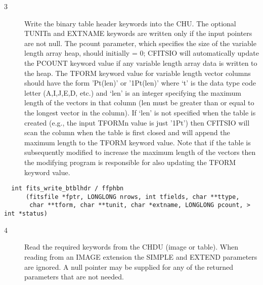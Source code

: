 \documentclass[11pt]{book}
\begin{document}
\begin{description}
\item[3 ] Write the binary table header keywords into the CHU.   The optional
   TUNITn and EXTNAME keywords are written only if the input pointers
   are not null.  The pcount parameter, which specifies the
   size of the variable length array heap, should initially = 0;
   CFITSIO will automatically update the PCOUNT keyword value if any
   variable length array data is written to the heap.  The TFORM keyword
   value for variable length vector columns should have the form 'Pt(len)'
   or '1Pt(len)' where `t' is the data type code letter (A,I,J,E,D, etc.)
   and  `len' is an integer specifying the maximum length of the vectors
   in that column (len must be greater than or equal to the longest
   vector in the column).  If `len' is not specified when the table is
   created (e.g., the input TFORMn value is just '1Pt') then CFITSIO will
   scan the column when the table is first closed and will append the
   maximum length to the TFORM keyword value.  Note that if the table
   is subsequently modified to increase the maximum length of the vectors
   then the modifying program is responsible for also updating the TFORM
  keyword value.  \label{ffphbn}
\end{description}

\begin{verbatim}
  int fits_write_btblhdr / ffphbn
      (fitsfile *fptr, LONGLONG nrows, int tfields, char **ttype,
       char **tform, char **tunit, char *extname, LONGLONG pcount, > int *status)
\end{verbatim}

\begin{description}
\item[4 ] Read the required keywords from the CHDU (image or table).  When
    reading from an IMAGE extension the SIMPLE and EXTEND parameters are
    ignored.  A null pointer may be supplied for any of the returned
   parameters that are not needed. \label{ffghpr} \label{ffghtb} \label{ffghbn}
\end{description}
\end{document}
